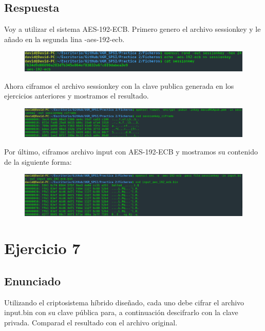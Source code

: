 \documentclass[10pt,a4paper,spanish]{report}
\begin{document}
\section{Respuesta}
\noindent
Voy a utilizar el sistema AES-192-ECB. Primero genero el archivo sessionkey y le añado en la segunda lina -aes-192-ecb.

\begin{figure}[!hbp]
 \centering  \includegraphics[width=1\textwidth]{./Imagenes/6_0.png}
\end{figure}

\noindent
Ahora ciframos el archivo sessionkey con la clave publica generada en los ejercicios anteriores y mostramos el resultado.

\begin{figure}[!hbp]
 \centering  \includegraphics[width=1\textwidth]{./Imagenes/6_1.png}
\end{figure}

\newpage
\noindent
Por último, ciframos archivo input con AES-192-ECB y mostramos su contenido de la siguiente forma:

\begin{figure}[!hbp]
 \centering  \includegraphics[width=1\textwidth]{./Imagenes/6_2.png}
\end{figure}


\chapter{Ejercicio 7}

\section{Enunciado}
\noindent
Utilizando el criptosistema híbrido diseñado, cada uno debe cifrar el archivo input.bin con su clave pública para, a continuación descifrarlo con la clave privada. Comparad el resultado con el archivo original.
\end{document}
